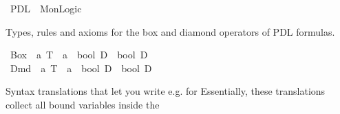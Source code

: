 %
\begin{isabellebody}%
\def\isabellecontext{PDL}%
%
\isamarkuptrue%
\ PDL\ {\isacharequal}\ MonLogic{\isacharcolon}\isamarkupfalse%
%
\label{sec:pdl-thy}
%
\isamarkuptrue%
%
\begin{isamarkuptext}%
Types, rules and axioms for the box and diamond operators of PDL formulas.
  \label{isa:pdl-calculus}%
\end{isamarkuptext}%
\isamarkuptrue%
\isanewline
\ Box\ {\isacharcolon}{\isacharcolon}\ {\isachardoublequote}{\isacharprime}a\ T\ {\isasymRightarrow}\ {\isacharparenleft}{\isacharprime}a\ {\isasymRightarrow}\ bool\ D{\isacharparenright}\ {\isasymRightarrow}\ bool\ D{\isachardoublequote}\ \ \ \ \ {\isacharparenleft}{\isachardoublequote}{\isacharbrackleft}{\isacharhash}\ {\isacharunderscore}{\isacharbrackright}{\isacharunderscore}{\isachardoublequote}\ {\isacharbrackleft}{}{\isacharcomma}\ {}{}{}{\isacharbrackright}\ {}{}{}{\isacharparenright}\isanewline
\ Dmd\ {\isacharcolon}{\isacharcolon}\ {\isachardoublequote}{\isacharprime}a\ T\ {\isasymRightarrow}\ {\isacharparenleft}{\isacharprime}a\ {\isasymRightarrow}\ bool\ D{\isacharparenright}\ {\isasymRightarrow}\ bool\ D{\isachardoublequote}\ \ \ \ \ {\isacharparenleft}{\isachardoublequote}{\isasymlangle}{\isacharunderscore}{\isasymrangle}{\isacharunderscore}{\isachardoublequote}\ {\isacharbrackleft}{}{\isacharcomma}\ {}{}{}{\isacharbrackright}\ {}{}{}{\isacharparenright}\isamarkupfalse%
%
\begin{isamarkuptext}%
Syntax translations that let you write e.g.
  for 
  Essentially, these translations collect all bound variables inside the 

\end{isamarkuptext}
\end{isabellebody}
